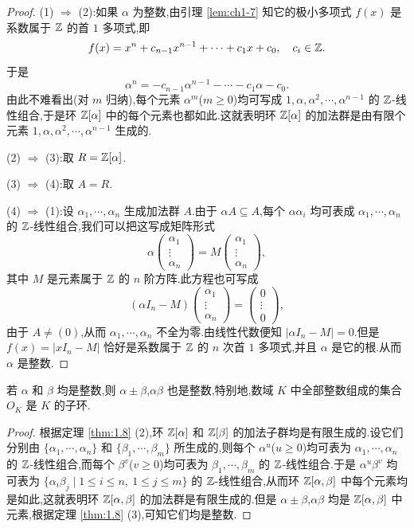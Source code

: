 \begin{proof}
(1) $\Rightarrow$ (2):如果 $\alpha$ 为整数,由引理 \ref{lem:ch1-7} 知它的极小多项式 $f(x)$ 是系数属于 $\mathbb{Z}$ 的首 $1$ 多项式,即
\[
  f(x)=x^n+c_{n-1}x^{n-1}+\cdots+c_1x+c_0,\quad c_i\in\mathbb{Z}.
\]
于是
\[
  \alpha^n=-c_{n-1}\alpha^{n-1}-\cdots-c_1\alpha-c_0.
\]
由此不难看出(对 $m$ 归纳),每个元素 $\alpha^m$($m\geqslant 0$)均可写成 $1,\alpha,\alpha^2,\cdots,\alpha^{n-1}$ 的 $\mathbb{Z}$-线性组合,于是环 $\mathbb{Z}[\alpha]$ 中的每个元素也都如此.这就表明环 $\mathbb{Z}[\alpha]$ 的加法群是由有限个元素 $1,\alpha,\alpha^2,\cdots,\alpha^{n-1}$ 生成的.

(2) $\Rightarrow$ (3):取 $R=\mathbb{Z}[\alpha]$.

(3) $\Rightarrow$ (4):取 $A=R$.

(4) $\Rightarrow$ (1):设 $\alpha_1,\cdots,\alpha_n$ 生成加法群 $A$.由于 $\alpha A\subseteq A$,每个 $\alpha\alpha_i$ 均可表成 $\alpha_1,\cdots,\alpha_n$ 的 $\mathbb{Z}$-线性组合,我们可以把这写成矩阵形式
\[
  \alpha\begin{pmatrix}\alpha_1\\ \vdots\\ \alpha_n\end{pmatrix}
  =M\begin{pmatrix}\alpha_1\\ \vdots\\ \alpha_n\end{pmatrix},
\]
其中 $M$ 是元素属于 $\mathbb{Z}$ 的 $n$ 阶方阵.此方程也可写成
\[
  (\alpha I_n-M)\begin{pmatrix}\alpha_1\\ \vdots\\ \alpha_n\end{pmatrix}
  =\begin{pmatrix}0\\ \vdots\\ 0\end{pmatrix},
\]
由于 $A\neq(0)$,从而 $\alpha_1,\cdots,\alpha_n$ 不全为零.由线性代数便知 $|\alpha I_n-M|=0$.但是 $f(x)=|xI_n-M|$ 恰好是系数属于 $\mathbb{Z}$ 的 $n$ 次首 $1$ 多项式,并且 $\alpha$ 是它的根.从而 $\alpha$ 是整数.
\end{proof}

\begin{theorem}\label{thm:1.9}
若 $\alpha$ 和 $\beta$ 均是整数,则 $\alpha\pm\beta$,$\alpha\beta$ 也是整数,特别地,数域 $K$ 中全部整数组成的集合 $O_K$ 是 $K$ 的子环.
\end{theorem}

\begin{proof}
根据定理 \ref{thm:1.8} (2),环 $\mathbb{Z}[\alpha]$ 和 $\mathbb{Z}[\beta]$ 的加法子群均是有限生成的.设它们分别由 $\{\alpha_1,\cdots,\alpha_n\}$ 和 $\{\beta_1,\cdots,\beta_m\}$ 所生成的,则每个 $\alpha^u$($u\geqslant 0$)均可表为 $\alpha_1,\cdots,\alpha_n$ 的 $\mathbb{Z}$-线性组合,而每个 $\beta^v$($v\geqslant 0$)均可表为 $\beta_1,\cdots,\beta_m$ 的 $\mathbb{Z}$-线性组合.于是 $\alpha^u\beta^v$ 均可表为 $\{\alpha_i\beta_j\mid 1\leqslant i\leqslant n,\ 1\leqslant j\leqslant m\}$ 的 $\mathbb{Z}$-线性组合,从而环 $\mathbb{Z}[\alpha,\beta]$ 中每个元素均是如此,这就表明环 $\mathbb{Z}[\alpha,\beta]$ 的加法群是有限生成的.但是 $\alpha\pm\beta$,$\alpha\beta$ 均是 $\mathbb{Z}[\alpha,\beta]$ 中元素,根据定理 \ref{thm:1.8} (3),可知它们均是整数.
\end{proof}

